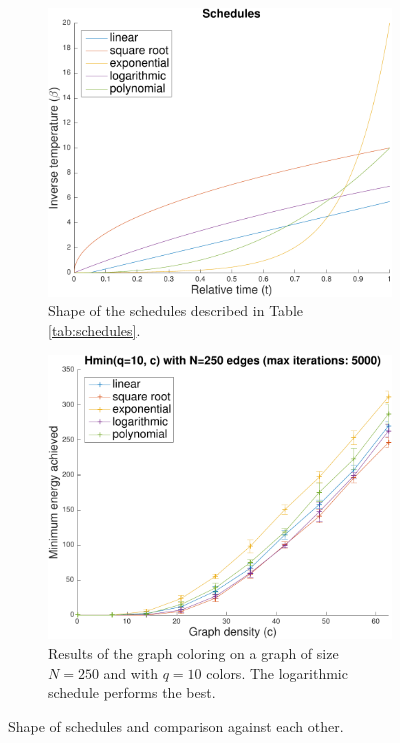 \documentclass{report}
\begin{document}
\begin{figure}[h]
\centering
\begin{subfigure}[t]{.5\linewidth}
  \centering
  \includegraphics[width=.8\linewidth]{figures/schedules_shape.pdf}
  \caption{Shape of the schedules described in Table \ref{tab:schedules}.}
  \label{fig:schedules_shape}
\end{subfigure}%
\begin{subfigure}[t]{.5\linewidth}
  \centering
  \includegraphics[width=.8\linewidth]{figures/schedules_evaluation.pdf}
  \caption{Results of the graph coloring on a graph of size $N=250$ and with $q=10$ colors. The logarithmic schedule performs the best.}
  \label{fig:schedules_evaluation}
\end{subfigure}
\caption{Shape of schedules and comparison against each other.}
\label{fig:schedules}
\end{figure}
\end{document}
